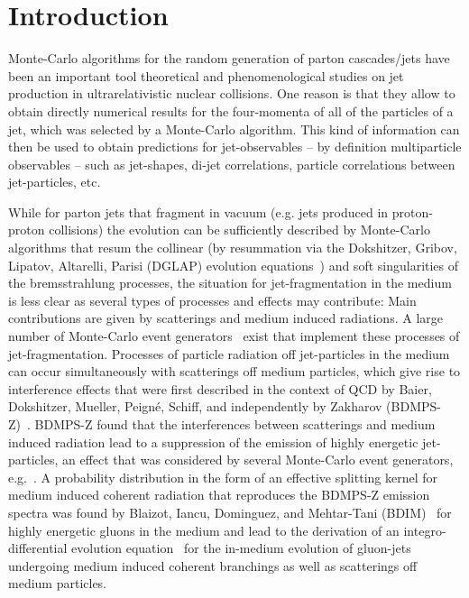 \documentclass[preprint,12pt]{elsarticle}
\begin{document}
\section{Introduction}
%
Monte-Carlo algorithms for the random generation of parton cascades/jets have been an important tool theoretical and phenomenological studies on jet production in ultrarelativistic nuclear collisions.
One reason is that they allow to obtain directly numerical results for the four-momenta of all of the particles of a jet, which was selected by a Monte-Carlo algorithm. 
This kind of information can then be used to obtain predictions for jet-observables -- by definition multiparticle observables -- such as jet-shapes, di-jet correlations, particle correlations between jet-particles, etc.

While for parton jets that fragment in vacuum (e.g. jets produced in proton-proton collisions) the evolution can be sufficiently described by Monte-Carlo algorithms that resum the collinear (by resummation via the Dokshitzer, Gribov, Lipatov, Altarelli, Parisi (DGLAP) evolution equations~\cite{ALTARELLI1977298,Dokshitzer:1977sg,Gribov:1972ri,Lipatov:1974qm}) and soft singularities of the bremsstrahlung processes, the situation for jet-fragmentation in the medium is less clear as several types of processes and effects may contribute: 
Main contributions are given by scatterings and medium induced radiations.
A large number of Monte-Carlo event generators~\cite{Armesto:2009fj, Schenke:2009gb,Zapp:2008gi,Zapp:2012ak,PhysRevC.78.034908,PhysRevC.88.014905,Lokhtin:2005px} exist that implement these processes of jet-fragmentation.
Processes of particle radiation off jet-particles in the medium can occur simultaneously with scatterings off medium particles, which give rise to interference effects that were first described in the context of QCD by Baier, Dokshitzer, Mueller, Peign\'e, Schiff, and independently by Zakharov (BDMPS-Z)~\cite{Baier:2000mf,Baier:2000sb,Zakharov:1996fv,Zakharov:1997uu,Zakharov:1999zk,Baier:1994bd,Baier:1996vi}.
BDMPS-Z found that the interferences between scatterings and medium induced radiation lead to a suppression of the emission of highly energetic jet-particles, an effect that was considered by several Monte-Carlo event generators, e.g.~\cite{Armesto:2009fj,Zapp:2008gi,Zapp:2012ak,Lokhtin:2005px}. A probability distribution in the form of an effective splitting kernel for medium induced coherent radiation that reproduces the BDMPS-Z emission spectra was found by Blaizot, Iancu, Dominguez, and Mehtar-Tani (BDIM)~\cite{Blaizot:2012fh} for highly energetic gluons in the medium and lead to the derivation of an integro-differential evolution equation~\cite{Blaizot:2013vha} for the in-medium evolution of gluon-jets undergoing medium induced coherent branchings as well as scatterings off medium particles.
\end{document}
